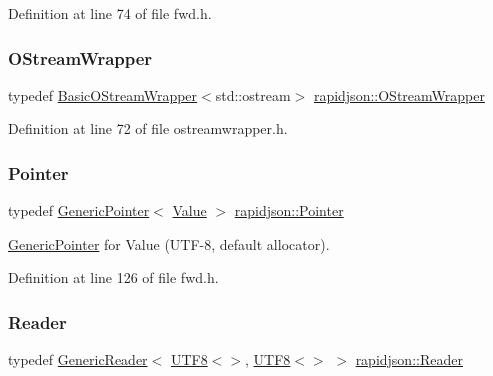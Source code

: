 Definition at line 74 of file fwd.\+h.

\mbox{\label{namespacerapidjson_a15f55e221e1d336afab91cc69c258187}} 
\subsubsection{\texorpdfstring{OStreamWrapper}{OStreamWrapper}}
{\footnotesize\ttfamily typedef \mbox{\hyperlink{classrapidjson_1_1_basic_o_stream_wrapper}{Basic\+O\+Stream\+Wrapper}}$<$std\+::ostream$>$ \mbox{\hyperlink{namespacerapidjson_a15f55e221e1d336afab91cc69c258187}{rapidjson\+::\+O\+Stream\+Wrapper}}}



Definition at line 72 of file ostreamwrapper.\+h.

\mbox{\label{namespacerapidjson_a080910f74d2f5046e6724280159cf374}} 
\subsubsection{\texorpdfstring{Pointer}{Pointer}}
{\footnotesize\ttfamily typedef \mbox{\hyperlink{classrapidjson_1_1_generic_pointer}{Generic\+Pointer}}$<$ \mbox{\hyperlink{namespacerapidjson_aa65fc9fb381b2cbc54f98673eadd6505}{Value}} $>$ \mbox{\hyperlink{namespacerapidjson_a080910f74d2f5046e6724280159cf374}{rapidjson\+::\+Pointer}}}



\mbox{\hyperlink{classrapidjson_1_1_generic_pointer}{Generic\+Pointer}} for Value (U\+T\+F-\/8, default allocator). 



Definition at line 126 of file fwd.\+h.

\mbox{\label{namespacerapidjson_ad5310edd1226f5b3ea82dc0d4d3740c6}} 
\subsubsection{\texorpdfstring{Reader}{Reader}}
{\footnotesize\ttfamily typedef \mbox{\hyperlink{classrapidjson_1_1_generic_reader}{Generic\+Reader}}$<$ \mbox{\hyperlink{structrapidjson_1_1_u_t_f8}{U\+T\+F8}}$<$$>$, \mbox{\hyperlink{structrapidjson_1_1_u_t_f8}{U\+T\+F8}}$<$$>$ $>$ \mbox{\hyperlink{namespacerapidjson_ad5310edd1226f5b3ea82dc0d4d3740c6}{rapidjson\+::\+Reader}}}



